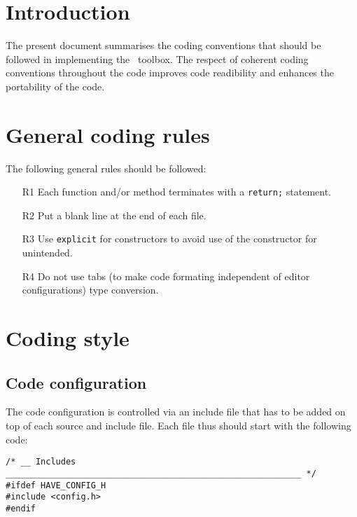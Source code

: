 \documentclass{article}[12pt,a4]
\begin{document}
\frontpage


\section{Introduction}

The present document summarises the coding conventions that should be
followed in implementing the \this\ toolbox.
The respect of coherent coding conventions throughout the code
improves code readibility and enhances the portability of the code.


\section{General coding rules}

The following general rules should be followed:
\begin{itemize}
\item[R1] Each function and/or method terminates with a {\tt return;} statement.
\item[R2] Put a blank line at the end of each file.
\item[R3] Use {\tt explicit} for constructors to avoid use of the constructor for unintended.
\item[R4] Do not use tabs (to make code formating independent of editor configurations)
type conversion.
\end{itemize}


\section{Coding style}

\subsection{Code configuration}

The code configuration is controlled via an include file that has to be added on top of
each source and include file.
Each file thus should start with the following code:

\begin{verbatim}
/* __ Includes ___________________________________________________________ */
#ifdef HAVE_CONFIG_H
#include <config.h>
#endif
\end{verbatim}
\end{document}
